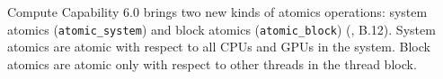 Compute Capability 6.0 brings two new kinds of atomics operations: system atomics (\texttt{atomic\*\_system}) and block atomics (\texttt{atomic\*\_block}) (\cite{nvidia2017cuda80}, B.12).
System atomics are atomic with respect to all CPUs and GPUs in the system.
Block atomics are atomic only with respect to other threads in the thread block.




